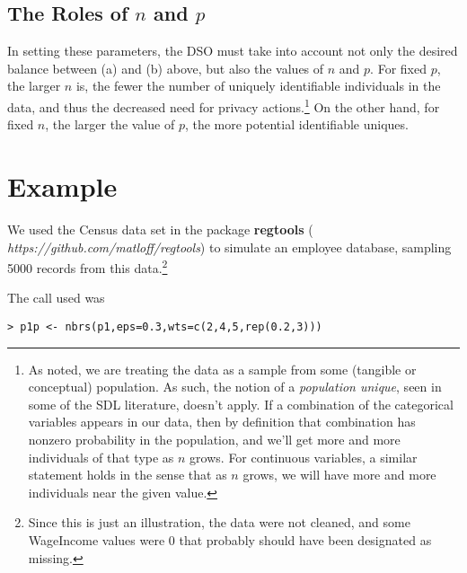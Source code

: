 \documentclass[11pt]{article}
\begin{document}
\subsection{The Roles of $n$ and $p$}

In setting these parameters, the DSO must take into account not only the
desired balance between (a) and (b) above, but also the values of $n$
and $p$.  For fixed $p$, the larger $n$ is, the fewer the number of
uniquely identifiable individuals in the data, and thus the decreased
need for privacy actions.\footnote{As noted, we are treating the data
as a sample from some (tangible or conceptual) population.  As such, the
notion of a {\it population unique}, seen in some of the SDL literature,
doesn't apply.  If a combination of the categorical variables appears in
our data, then by definition that combination has nonzero probability in
the population, and we'll get more and more individuals of that type as
$n$ grows.  For continuous variables, a similar statement holds in the
sense that as $n$ grows, we will have more and more individuals near the
given value.} On the other hand, for fixed $n$, the larger the value of
$p$, the more potential identifiable uniques.

\section{Example}

We used the Census data set in the package {\bf regtools} ({\it
https://github.com/matloff/regtools}) to simulate an employee
database, sampling 5000 records from this data.\footnote{Since this is
just an illustration, the data were not cleaned, and some WageIncome
values were 0 that probably should have been designated as missing.}


The call used was

\begin{lstlisting}
> p1p <- nbrs(p1,eps=0.3,wts=c(2,4,5,rep(0.2,3)))
\end{lstlisting}
\end{document}
